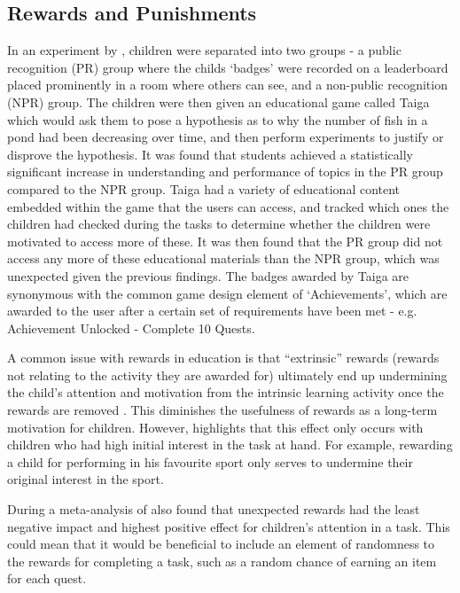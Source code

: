 \subsection{Rewards and Punishments}
In an experiment by \cite{Filsecker2014136}, children were separated into two groups - a public recognition (PR) group where the childs `badges' were recorded on a leaderboard placed prominently in a room where others can see, and a non-public recognition (NPR) group.
The children were then given an educational game called Taiga which would ask them to pose a hypothesis as to why the number of fish in a pond had been decreasing over time, and then perform experiments to justify or disprove the hypothesis.
It was found that students achieved a statistically significant increase in understanding and performance of topics in the PR group compared to the NPR group.
Taiga had a variety of educational content embedded within the game that the users can access, and tracked which ones the children had checked during the tasks to determine whether the children were motivated to access more of these. 
It was then found that the PR group did not access any more of these educational materials than the NPR group, which was unexpected given the previous findings. 
The badges awarded by Taiga are synonymous with the common game design element of `Achievements', which are awarded to the user after a certain set of requirements have been met - e.g. Achievement Unlocked - Complete 10 Quests.

A common issue with rewards in education is that ``extrinsic'' rewards (rewards not relating to the activity they are awarded for) ultimately end up undermining the child's attention and motivation from the intrinsic learning activity once the rewards are removed \citep{deci2001extrinsic,ACP:ACP2350090502}.
This diminishes the usefulness of rewards as a long-term motivation for children.
However, \cite{cameron2001negative} highlights that this effect only occurs with children who had high initial interest in the task at hand. 
For example, rewarding a child for performing in his favourite sport only serves to undermine their original interest in the sport.

During a meta-analysis of \cite{deci2001extrinsic} also found that unexpected rewards had the least negative impact and highest positive effect for children's attention in a task. 
This could mean that it would be beneficial to include an element of randomness to the rewards for completing a task, such as a random chance of earning an item for each quest.


